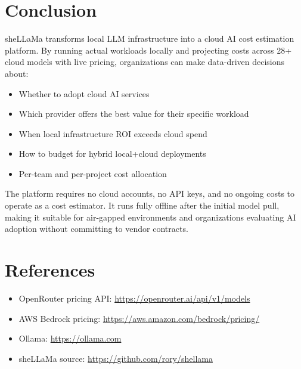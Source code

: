 \documentclass[11pt,a4paper]{article}
\begin{document}
\section{Conclusion}

sheLLaMa transforms local LLM infrastructure into a cloud AI cost estimation platform. By running actual workloads locally and projecting costs across 28+ cloud models with live pricing, organizations can make data-driven decisions about:

\begin{itemize}
  \item Whether to adopt cloud AI services
  \item Which provider offers the best value for their specific workload
  \item When local infrastructure ROI exceeds cloud spend
  \item How to budget for hybrid local+cloud deployments
  \item Per-team and per-project cost allocation
\end{itemize}

The platform requires no cloud accounts, no API keys, and no ongoing costs to operate as a cost estimator. It runs fully offline after the initial model pull, making it suitable for air-gapped environments and organizations evaluating AI adoption without committing to vendor contracts.

\section{References}

\begin{itemize}
  \item OpenRouter pricing API: \url{https://openrouter.ai/api/v1/models}
  \item AWS Bedrock pricing: \url{https://aws.amazon.com/bedrock/pricing/}
  \item Ollama: \url{https://ollama.com}
  \item sheLLaMa source: \url{https://github.com/rory/shellama}
\end{itemize}
\end{document}
